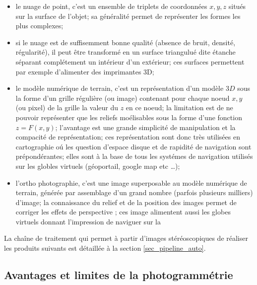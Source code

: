 \begin{itemize}
   \item le nuage de point, c'est un ensemble de triplets de coordonnées $x,y,z$ situés sur la surface de l'objet; sa généralité permet de représenter les formes les plus complexes;

   \item si le nuage est de suffisemment bonne qualité (absence de bruit, densité, régularité), il peut être transformé en un surface triangulué dite étanche séparant complétement un intérieur d'un extérieur; ces surfaces permettent par exemple d'alimenter des imprimantes 3D;

   \item le modèle numérique de terrain, c'est un représentation d'un modèle $3D$ sous la forme d'un grille r\'eguli\`ere (ou image) contenant pour chaque noeud $x,y$ (ou pixel) de la grille la valeur du $z$ en ce noeud; la limitation est de ne pouvoir représenter que les reliefs mo\'elisables  sous la forme d'une fonction $z=F(x,y)$; l'avantage est une grande simplicité de manipulation et la compacité de représentation; ces repr\'esentation sont donc tr\`es utilis\'ees en cartographie o\'u les question d'espace disque et de rapidit\'e de navigation sont prépond\'erantes; elles sont à la base de tous les syst\'emes de navigation utilisés sur les globles virtuels (géoportail, google map etc \dots);

   \item l'ortho photographie, c'est une image superposable au mod\`ele num\'erique de terrain, g\'en\'er\'ee par assemblage d'un grand nombre (parfois plusieurs milliers) d'image; la connaissance du relief et de la position des images permet de corriger les effets de perspective ; ces image alimentent aussi les globes virtuels donnant l'impression de naviguer sur la 

\end{itemize}


 La chaîne de traitement qui permet à partir d'images stéréoscopiques de réaliser les produits suivants est détaillée à la section \ref{sec_pipeline_auto}.
\subsection{Avantages et limites de la photogrammétrie}
